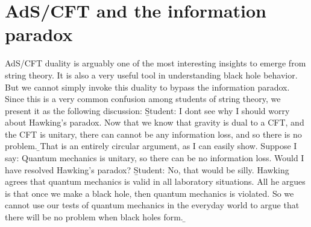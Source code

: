 \documentclass[12pt]{article}
\begin{document}
\section{AdS/CFT and the information paradox}

AdS/CFT \cite{maldacena, gkp, witten} duality is arguably one of the most interesting insights to emerge from string theory. It is also a very useful tool in understanding black hole behavior. But we cannot simply invoke this duality to bypass the information paradox. Since this is a very common confusion among students of string theory, we present it as the following discussion:
\b

Student: I dont see why I should worry about Hawking's paradox. Now that we know that gravity is dual to a CFT, and the CFT is unitary, there can cannot be any information loss, and so there is no problem.
\b


\hb That is an entirely circular argument, as I can easily show. Suppose I say: Quantum mechanics is unitary, so there can be no information loss. Would I have resolved Hawking's paradox?
\b
Student: No, that would be silly. Hawking agrees that quantum mechanics is valid in all laboratory situations. All he argues is that once we make a black hole, then quantum mechanics is violated. So we cannot use our tests of quantum mechanics in the everyday world to argue that there will be no problem when black holes form.
\b
\end{document}
